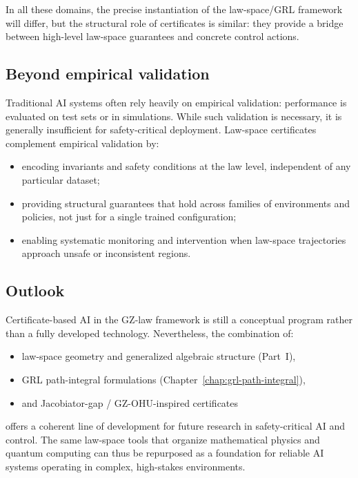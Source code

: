 \documentclass[11pt]{book}
\theoremstyle{plain}
\theoremstyle{definition}
\theoremstyle{remark}
\begin{document}
In all these domains, the precise instantiation of the
law-space/GRL framework will differ, but the structural role of
certificates is similar: they provide a bridge between high-level
law-space guarantees and concrete control actions.

\subsection*{Beyond empirical validation}

Traditional AI systems often rely heavily on empirical validation:
performance is evaluated on test sets or in simulations. While such
validation is necessary, it is generally insufficient for
safety-critical deployment. Law-space certificates complement
empirical validation by:
\begin{itemize}
  \item encoding invariants and safety conditions at the law level,
        independent of any particular dataset;
  \item providing structural guarantees that hold across families of
        environments and policies, not just for a single trained
        configuration;
  \item enabling systematic monitoring and intervention when
        law-space trajectories approach unsafe or inconsistent
        regions.
\end{itemize}

\subsection*{Outlook}

Certificate-based AI in the GZ-law framework is still a conceptual
program rather than a fully developed technology. Nevertheless, the
combination of:
\begin{itemize}
  \item law-space geometry and generalized algebraic structure
        (Part~I),
  \item GRL path-integral formulations (Chapter~\ref{chap:grl-path-integral}),
  \item and Jacobiator-gap / GZ-OHU-inspired certificates
\end{itemize}
offers a coherent line of development for future research in
safety-critical AI and control. The same law-space tools that
organize mathematical physics and quantum computing can thus be
repurposed as a foundation for reliable AI systems operating in
complex, high-stakes environments.
\end{document}
